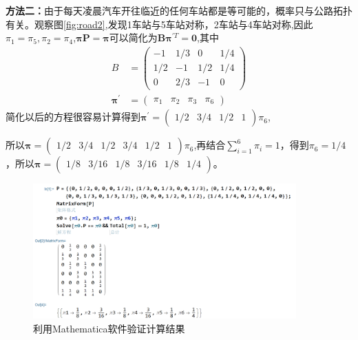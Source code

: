 \begin{enumerate}
	      \textbf{方法二：}由于每天凌晨汽车开往临近的任何车站都是等可能的，概率只与公路拓扑有关。观察图\ref{fig:road2},发现1车站与5车站对称，2车站与4车站对称,因此\(\pi_1=\pi_5,\pi_2=\pi_4\),\(\boldsymbol{\pi}\mathbf{P}=\boldsymbol{\pi}\)可以简化为\(\mathbf{B}\boldsymbol{\pi}^{\prime T}=\mathbf{0}\),其中
	      \begin{align*}
		      B
		       & =\begin{pmatrix}
			          -1  & 1/3 & 0   & 1/4 \\
			          1/2 & -1  & 1/2 & 1/4 \\
			          0   & 2/3 & -1  & 0
		          \end{pmatrix}         \\
		      \boldsymbol{\pi}^{\prime}
		       & =\begin{pmatrix}
			          \pi_1 & \pi_2 & \pi_3 & \pi_6
		          \end{pmatrix}
	      \end{align*}
	      简化以后的方程很容易计算得到\(\boldsymbol{\pi}^{\prime}=\begin{pmatrix}1/2 & 3/4 & 1/2 & 1\end{pmatrix}\pi_6\),

	      所以\(\boldsymbol{\pi}=\begin{pmatrix}1/2 & 3/4 & 1/2 & 3/4 & 1/2 &1\end{pmatrix}\pi_6\),再结合\(\sum_{i=1}^{6}\pi_i=1\)，得到\(\pi_6=1/4\)，所以\(\boldsymbol{\pi}=\begin{pmatrix}1/8& 3/16&1/8&3/16&1/8&1/4\end{pmatrix}\)。

	      \begin{figure}[H]\label{fig:mathematica}
		      \begin{center}
			      \includegraphics[width=0.9\textwidth]{fig2.png}
			      \caption{利用Mathematica软件验证计算结果}
		      \end{center}\end{figure}



\end{enumerate}
